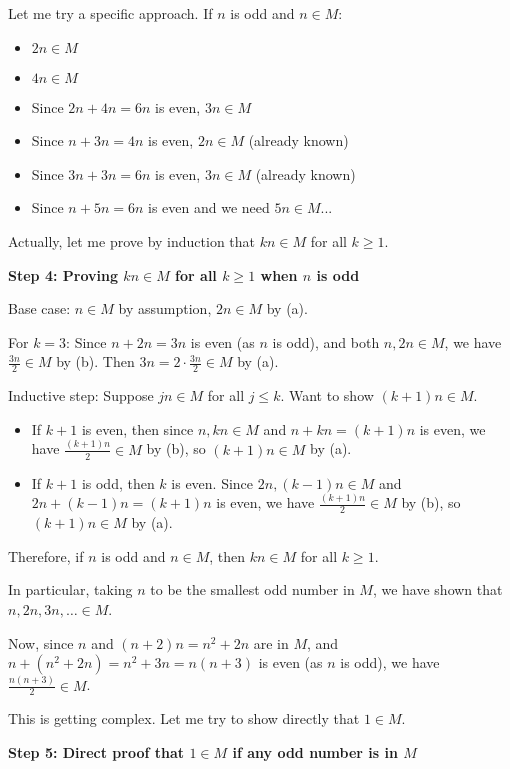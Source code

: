 \documentclass[12pt,a4paper]{article}
\theoremstyle{definition}
\begin{document}
    Let me try a specific approach. If $n$ is odd and $n \in M$:
    \begin{itemize}
        \item $2n \in M$
        \item $4n \in M$
        \item Since $2n + 4n = 6n$ is even, $3n \in M$
        \item Since $n + 3n = 4n$ is even, $2n \in M$ (already known)
        \item Since $3n + 3n = 6n$ is even, $3n \in M$ (already known)
        \item Since $n + 5n = 6n$ is even and we need $5n \in M$...
    \end{itemize}

    Actually, let me prove by induction that $kn \in M$ for all $k \geq 1$.

    \textbf{Step 4: Proving $kn \in M$ for all $k \geq 1$ when $n$ is odd}

    Base case: $n \in M$ by assumption, $2n \in M$ by (a).

    For $k = 3$: Since $n + 2n = 3n$ is even (as $n$ is odd), and both $n, 2n \in M$, we have $\frac{3n}{2} \in M$ by (b). Then $3n = 2 \cdot \frac{3n}{2} \in M$ by (a).

    Inductive step: Suppose $jn \in M$ for all $j \leq k$. Want to show $(k+1)n \in M$.
    \begin{itemize}
        \item If $k+1$ is even, then since $n, kn \in M$ and $n + kn = (k+1)n$ is even, we have $\frac{(k+1)n}{2} \in M$ by (b), so $(k+1)n \in M$ by (a).
        \item If $k+1$ is odd, then $k$ is even. Since $2n, (k-1)n \in M$ and $2n + (k-1)n = (k+1)n$ is even, we have $\frac{(k+1)n}{2} \in M$ by (b), so $(k+1)n \in M$ by (a).
    \end{itemize}

    Therefore, if $n$ is odd and $n \in M$, then $kn \in M$ for all $k \geq 1$.

    In particular, taking $n$ to be the smallest odd number in $M$, we have shown that $n, 2n, 3n, \ldots \in M$.

    Now, since $n$ and $(n+2)n = n^2 + 2n$ are in $M$, and $n + (n^2 + 2n) = n^2 + 3n = n(n+3)$ is even (as $n$ is odd), we have $\frac{n(n+3)}{2} \in M$.

    This is getting complex. Let me try to show directly that $1 \in M$.

    \textbf{Step 5: Direct proof that $1 \in M$ if any odd number is in $M$}
\end{document}
